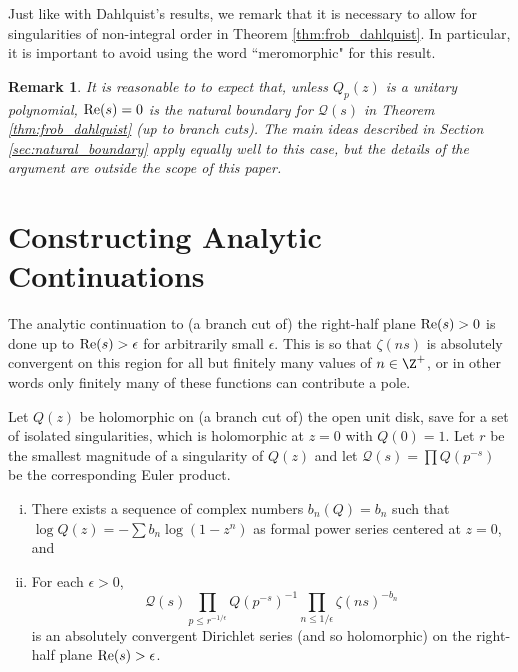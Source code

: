 \documentclass[12pt]{amsart}
\newtheorem{remark}[theorem]{Remark}
\theoremstyle{plain}
\begin{document}
Just like with Dahlquist's results, we remark that it is necessary to allow for singularities of non-integral order in Theorem \ref{thm:frob_dahlquist}. In particular, it is important to avoid using the word ``meromorphic" for this result.

\begin{remark}
    It is reasonable to to expect that, unless $Q_p(z)$ is a unitary polynomial, ${\rm Re}(s) = 0$ is the natural boundary for $\mathcal{Q}(s)$ in Theorem \ref{thm:frob_dahlquist} (up to branch cuts). The main ideas described in Section \ref{sec:natural_boundary} apply equally well to this case, but the details of the argument are outside the scope of this paper.
\end{remark}









\section{Constructing Analytic Continuations}

The analytic continuation to (a branch cut of) the right-half plane ${\rm Re}(s) > 0$ is done up to ${\rm Re}(s) > \epsilon$ for arbitrarily small $\epsilon$. This is so that $\zeta(ns)$ is absolutely convergent on this region for all but finitely many values of $n\in \Z^+$, or in other words only finitely many of these functions can contribute a pole.

\begin{theorem}\label{thm:existence_const_coef}
    Let $Q(z)$ be holomorphic on (a branch cut of) the open unit disk, save for a set of isolated singularities, which is holomorphic at $z=0$ with $Q(0)=1$. Let $r$ be the smallest magnitude of a singularity of $Q(z)$ and let $\mathcal{Q}(s) = \prod Q(p^{-s})$ be the corresponding Euler product.
    \begin{enumerate}[(i)]
        \item There exists a sequence of complex numbers $b_n(Q) = b_n$ such that $\log Q(z) = -\sum b_n\log(1-z^n)$ as formal power series centered at $z=0$, and
        \item For each $\epsilon > 0$,
        \[
            \mathcal{Q}(s) \prod_{p\le r^{-1/\epsilon}}Q(p^{-s})^{-1}\prod_{n\le 1/\epsilon}\zeta(ns)^{-b_n}
        \]
        is an absolutely convergent Dirichlet series (and so holomorphic) on the right-half plane ${\rm Re}(s) > \epsilon$.
    \end{enumerate}
\end{theorem}
\end{document}
